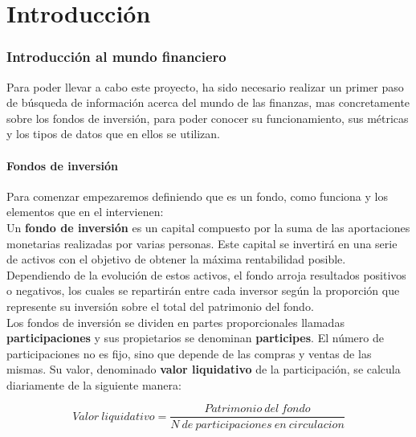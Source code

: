 \documentclass[12pt, a4paper]{article}
\begin{document}
\part{Introducción}
\section{Introducción al mundo financiero}
\vspace{1cm}
Para poder llevar a cabo este proyecto, ha sido necesario realizar un primer paso de búsqueda de información acerca del mundo de las finanzas, mas concretamente sobre los fondos de inversión, para poder conocer su funcionamiento, sus métricas y los tipos de datos que en ellos se utilizan.\\

\subsection{Fondos de inversión}

Para comenzar empezaremos definiendo que es un fondo, como funciona y los elementos que en el intervienen:\\

Un \textbf{fondo de inversión} es un capital compuesto por la suma de las aportaciones monetarias realizadas por varias personas. Este capital se invertirá en una serie de activos con el objetivo de obtener la máxima rentabilidad posible. Dependiendo de la evolución de estos activos, el fondo arroja resultados positivos o negativos, los cuales se repartirán entre cada inversor según la proporción que represente su inversión sobre el total del patrimonio del fondo.\\

Los fondos de inversión se dividen en partes proporcionales llamadas \textbf{participaciones} y sus propietarios se denominan \textbf{participes}. El número de participaciones no es fijo, sino que depende de las compras y ventas de las mismas. Su valor, denominado \textbf{valor liquidativo} de la participación, se calcula diariamente de la siguiente manera: 
	
\begin{center}
	\begin{equation}
	Valor\ liquidativo = \frac{ Patrimonio\ del\ fondo}{N\ de\ participaciones\ en\ circulacion}
	\end{equation}
	\label{valorliquidativo}
\end{center}
\vspace{1cm}
\end{document}
